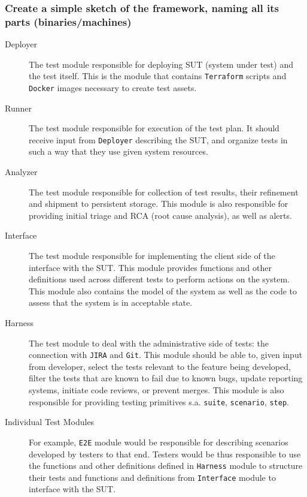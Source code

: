\documentclass[11pt]{article}
\begin{document}
\subsubsection{Create a simple sketch of the framework, naming all its parts (binaries/machines)}
\label{sec:org1ee0a52}
\begin{description}
\item[{Deployer}] The test module responsible for deploying SUT
(system under test) and the test itself.  This is
the module that contains \texttt{Terraform} scripts and
\texttt{Docker} images necessary to create test assets.
\item[{Runner}] The test module responsible for execution of the test
plan.  It should receive input from \texttt{Deployer}
describing the SUT, and organize tests in such a way
that they use given system resources.
\item[{Analyzer}] The test module responsible for collection of test
results, their refinement and shipment to persistent
storage.  This module is also responsible for
providing initial triage and RCA (root cause
analysis), as well as alerts.
\item[{Interface}] The test module responsible for implementing the
client side of the interface with the SUT.  This
module provides functions and other definitions
used across different tests to perform actions on
the system.  This module also contains the model of
the system as well as the code to assess that the
system is in acceptable state.
\item[{Harness}] The test module to deal with the administrative side
of tests: the connection with \texttt{JIRA} and \texttt{Git}.  This
module should be able to, given input from developer,
select the tests relevant to the feature being
developed, filter the tests that are known to fail
due to known bugs, update reporting systems, initiate
code reviews, or prevent merges.  This module is also
responsible for providing testing primitives
s.a. \texttt{suite}, \texttt{scenario}, \texttt{step}.
\item[{Individual Test Modules}] For example, \texttt{E2E} module would be
responsible for describing scenarios developed by testers to
that end.  Testers would be thus responsible to use the
functions and other definitions defined in \texttt{Harness} module
to structure their tests and functions and definitions from
\texttt{Interface} module to interface with the SUT.
\end{description}
\end{document}

